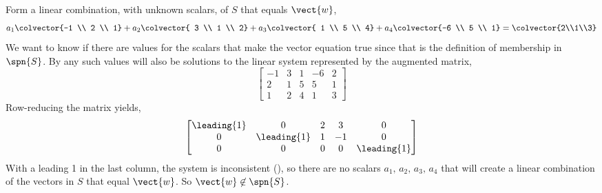 Form a linear combination, with unknown scalars, of $S$ that equals $\vect{w}$,
%
\begin{equation*}
a_1\colvector{-1 \\ 2 \\ 1}+
a_2\colvector{ 3 \\ 1 \\ 2}+
a_3\colvector{ 1 \\ 5 \\ 4}+
a_4\colvector{-6 \\ 5 \\ 1}
=
\colvector{2\\1\\3}
\end{equation*}
%
We want to know if there are values for the scalars that make the vector equation true since that is the definition of membership in $\spn{S}$.  By  any such values will also be solutions to the linear system represented by the augmented matrix,
%
\begin{equation*}
\begin{bmatrix}
 -1 & 3 & 1 & -6 & 2 \\
 2 & 1 & 5 & 5 & 1 \\
 1 & 2 & 4 & 1 & 3
\end{bmatrix}
\end{equation*}
%
Row-reducing the matrix yields,
%
\begin{equation*}
\begin{bmatrix}
 \leading{1} & 0 & 2 & 3 & 0 \\
 0 & \leading{1} & 1 & -1 & 0 \\
 0 & 0 & 0 & 0 & \leading{1}
\end{bmatrix}
\end{equation*}
%
With a leading 1 in the last column, the system is inconsistent (), so there are no scalars $a_1,\,a_2,\,a_3,\,a_4$ that will create a linear combination of the vectors in $S$ that equal $\vect{w}$.  So $\vect{w}\not\in\spn{S}$.